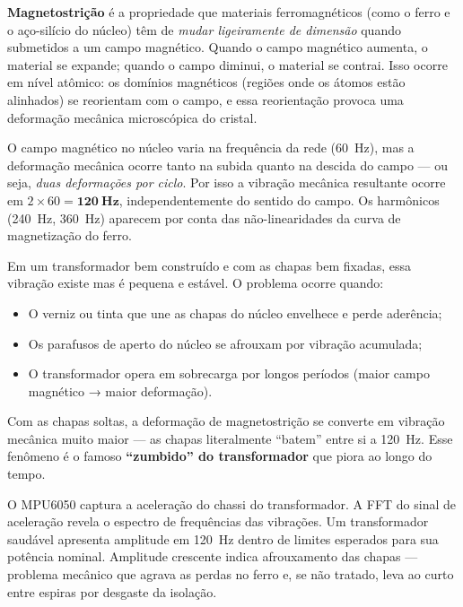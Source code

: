 \documentclass[12pt, a4paper]{article}
\begin{document}
\textbf{Magnetostrição} é a propriedade que materiais ferromagnéticos (como o ferro e o aço-silício do núcleo) têm de \emph{mudar ligeiramente de dimensão} quando submetidos a um campo magnético. Quando o campo magnético aumenta, o material se expande; quando o campo diminui, o material se contrai. Isso ocorre em nível atômico: os domínios magnéticos (regiões onde os átomos estão alinhados) se reorientam com o campo, e essa reorientação provoca uma deformação mecânica microscópica do cristal.

O campo magnético no núcleo varia na frequência da rede (60~Hz), mas a deformação mecânica ocorre tanto na subida quanto na descida do campo --- ou seja, \emph{duas deformações por ciclo}. Por isso a vibração mecânica resultante ocorre em $2 \times 60 = \mathbf{120~Hz}$, independentemente do sentido do campo. Os harmônicos (240~Hz, 360~Hz) aparecem por conta das não-linearidades da curva de magnetização do ferro.

Em um transformador bem construído e com as chapas bem fixadas, essa vibração existe mas é pequena e estável. O problema ocorre quando:
\begin{itemize}[leftmargin=2cm]
    \item O verniz ou tinta que une as chapas do núcleo envelhece e perde aderência;
    \item Os parafusos de aperto do núcleo se afrouxam por vibração acumulada;
    \item O transformador opera em sobrecarga por longos períodos (maior campo magnético → maior deformação).
\end{itemize}

Com as chapas soltas, a deformação de magnetostrição se converte em vibração mecânica muito maior --- as chapas literalmente ``batem'' entre si a 120~Hz. Esse fenômeno é o famoso \textbf{``zumbido'' do transformador} que piora ao longo do tempo.

\begin{tcolorbox}[caixaAviso, title={Diagnóstico por Vibração com o MPU6050}]
O MPU6050 captura a aceleração do chassi do transformador. A FFT do sinal de aceleração revela o espectro de frequências das vibrações. Um transformador saudável apresenta amplitude em 120~Hz dentro de limites esperados para sua potência nominal. Amplitude crescente indica afrouxamento das chapas --- problema mecânico que agrava as perdas no ferro e, se não tratado, leva ao curto entre espiras por desgaste da isolação.
\end{tcolorbox}
\end{document}
